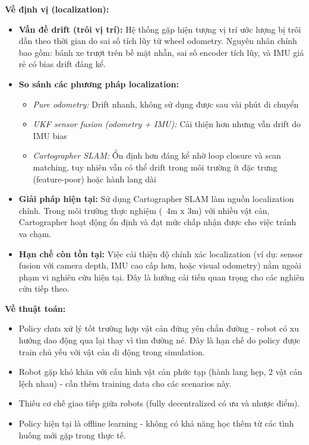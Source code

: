 \textbf{Về định vị (localization):}
\begin{itemize}[nosep]
\item \textbf{Vấn đề drift (trôi vị trí):} Hệ thống gặp hiện tượng vị trí ước lượng bị trôi dần theo thời gian do sai số tích lũy từ wheel odometry. Nguyên nhân chính bao gồm: bánh xe trượt trên bề mặt nhẵn, sai số encoder tích lũy, và IMU giá rẻ có bias drift đáng kể.

\item \textbf{So sánh các phương pháp localization:}
\begin{itemize}[nosep]
\item \textit{Pure odometry:} Drift nhanh, không sử dụng được sau vài phút di chuyển
\item \textit{UKF sensor fusion (odometry + IMU):} Cải thiện hơn nhưng vẫn drift do IMU bias
\item \textit{Cartographer SLAM:} Ổn định hơn đáng kể nhờ loop closure và scan matching, tuy nhiên vẫn có thể drift trong môi trường ít đặc trưng (feature-poor) hoặc hành lang dài
\end{itemize}

\item \textbf{Giải pháp hiện tại:} Sử dụng Cartographer SLAM làm nguồn localization chính. Trong môi trường thực nghiệm (~4m x 3m) với nhiều vật cản, Cartographer hoạt động ổn định và đạt mức chấp nhận được cho việc tránh va chạm.

\item \textbf{Hạn chế còn tồn tại:} Việc cải thiện độ chính xác localization (ví dụ: sensor fusion với camera depth, IMU cao cấp hơn, hoặc visual odometry) nằm ngoài phạm vi nghiên cứu hiện tại. Đây là hướng cải tiến quan trọng cho các nghiên cứu tiếp theo.
\end{itemize}

\textbf{Về thuật toán:}
\begin{itemize}[nosep]
\item Policy chưa xử lý tốt trường hợp vật cản đứng yên chắn đường - robot có xu hướng dao động qua lại thay vì tìm đường né. Đây là hạn chế do policy được train chủ yếu với vật cản di động trong simulation.
\item Robot gặp khó khăn với cấu hình vật cản phức tạp (hành lang hẹp, 2 vật cản lệch nhau) - cần thêm training data cho các scenarios này.
\item Thiếu cơ chế giao tiếp giữa robots (fully decentralized có ưu và nhược điểm).
\item Policy hiện tại là offline learning - không có khả năng học thêm từ các tình huống mới gặp trong thực tế.
\end{itemize}

